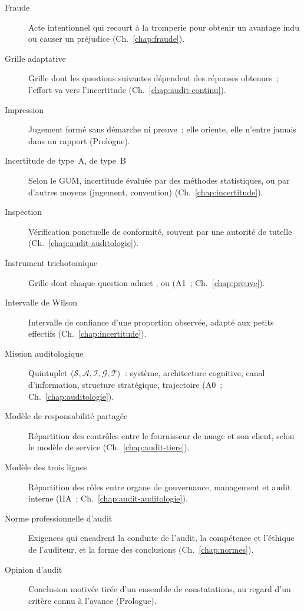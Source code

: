 \begin{description}
    \item[Fraude] Acte intentionnel qui recourt à la tromperie pour obtenir
          un avantage indu ou causer un préjudice (Ch.~\ref{chap:fraude}).
    \item[Grille adaptative] Grille dont les questions suivantes dépendent
          des réponses obtenues~; l'effort va vers l'incertitude
          (Ch.~\ref{chap:audit-continu}).
    \item[Impression] Jugement formé sans démarche ni preuve~; elle oriente,
          elle n'entre jamais dans un rapport (Prologue).
    \item[Incertitude de type~A, de type~B] Selon le GUM, incertitude
          évaluée par des méthodes statistiques, ou par d'autres moyens
          (jugement, convention) (Ch.~\ref{chap:incertitude}).
    \item[Inspection] Vérification ponctuelle de conformité, souvent par une
          autorité de tutelle (Ch.~\ref{chap:audit-auditologie}).
    \item[Instrument trichotomique] Grille dont chaque question admet
          \OUI{}, \NON{} ou \NEK{} (A1~; Ch.~\ref{chap:preuve}).
    \item[Intervalle de Wilson] Intervalle de confiance d'une proportion
          observée, adapté aux petits effectifs (Ch.~\ref{chap:incertitude}).
    \item[Mission auditologique] Quintuplet
          $\langle \mathcal{S}, \mathcal{A}, \mathcal{I}, \mathcal{G},
          \mathcal{T} \rangle$~: système, architecture cognitive, canal
          d'information, structure stratégique, trajectoire
          (A0~; Ch.~\ref{chap:auditologie}).
    \item[Modèle de responsabilité partagée] Répartition des contrôles
          entre le fournisseur de nuage et son client, selon le modèle de
          service (Ch.~\ref{chap:audit-tiers}).
    \item[Modèle des trois lignes] Répartition des rôles entre organe de
          gouvernance, management et audit interne (IIA~;
          Ch.~\ref{chap:audit-auditologie}).
    \item[Norme professionnelle d'audit] Exigences qui encadrent la conduite
          de l'audit, la compétence et l'éthique de l'auditeur, et la forme
          des conclusions (Ch.~\ref{chap:normes}).
    \item[Opinion d'audit] Conclusion motivée tirée d'un ensemble de
          constatations, au regard d'un critère connu à l'avance
          (Prologue).

\end{description}
